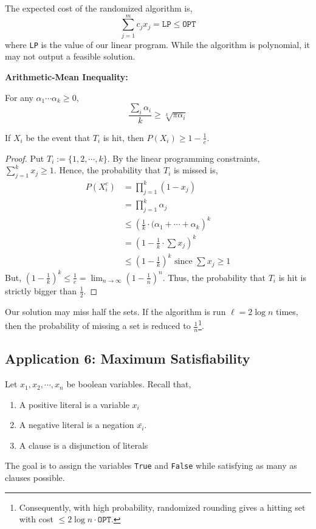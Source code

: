 \begin{rmk}
	The expected cost of the randomized algorithm is,
	\[\sum_{j=1}^{m} c_{j} x_{j} = \texttt{LP} \leq \texttt{OPT}\]
	\noindent where \texttt{LP} is the value of our linear program. While the algorithm is polynomial, it may not output a feasible solution.
\end{rmk}

\begin{marginfigure}
	\textbf{Arithmetic-Mean Inequality: }

	\noindent For any $\alpha_1 \cdots \alpha_k \geq 0$,
	\[\frac{\sum_{i} \alpha_{i}}{k} \geq \sqrt[k]{\pi \alpha_{i}}\]
\end{marginfigure}

\begin{rmk}
	If $X_i$ be the event that $T_i$ is hit, then $P(X_i) \geq 1 - \frac{1}{e}$.
\end{rmk}

\begin{proof}
	Put $T_i := \{1, 2, \cdots, k\}$. By the linear programming constraints, $\sum_{j=1}^k x_j \geq 1$. Hence, the probability that $T_i$ is missed is,
	\begin{align*}
		P(X_i^c) &= \prod_{j=1}^k (1 - x_j) \\
				 &= \prod_{j=1}^k \alpha_j \\
				 &\leq \left(\frac{1}{k} \cdot (\alpha_1 + \cdots + \alpha_k\right)^k \\
				 &= (1 - \frac{1}{k} \cdot \sum x_j)^k \\
				 &\leq (1 - \frac{1}{k})^k \text{ since $\sum x_j \geq 1$}
	\end{align*}
	\noindent But, $(1 - \frac{1}{k})^k \leq \frac{1}{e} = \lim_{n \rightarrow \infty} \left(1 - \frac{1}{n}\right)^n$. Thus, the probability that $T_i$ is hit is strictly bigger than $\frac{1}{2}$.
\end{proof}

\begin{cor}
	Our solution may miss half the sets. If the algorithm is run $\ell = 2 \log n$ times, then the probability of missing a set is reduced to $\frac{1}{n}$\footnote{Consequently, with high probability, randomized rounding gives a hitting set with cost $\leq 2 \log n \cdot \texttt{OPT}$.}.
\end{cor}

\subsection{Application 6: Maximum Satisfiability}
Let $x_1, x_2, \cdots, x_n$ be boolean variables. Recall that,
\begin{enumerate}
	\item A positive literal is a variable $x_i$
	\item A negative literal is a negation $\bar{x_i}$.
	\item A clause is a disjunction of literals
\end{enumerate}
The goal is to assign the variables \texttt{True} and \texttt{False} while satisfying as many as clauses possible.

